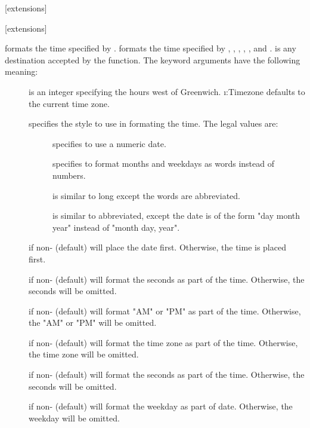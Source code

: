 [extensions]{
       }

[extensions]{
              }

 formats the time specified by .
 formats the time specified by ,
, , , , and .
 is any destination accepted by the  function.
The keyword arguments have the following meaning:
\begin{description}

\item[]
is an integer specifying the hours west of Greenwich.
\i{:Timezone} defaults to the current time zone.

\item[]
specifies the style to use in formating the time.  The legal
values are:
\begin{description}

\item[]
specifies to use a numeric date.

\item[]
specifies to format months and weekdays as words instead of
numbers.

\item[]
is similar to long except the words are abbreviated.

\item[]
is similar to abbreviated, except the date is of the form
"day month year" instead of "month day, year".
\end{description}

\item[]
if non-\false{} (default) will place the date first.
Otherwise, the time is placed first.

\item[]
if non-\false{} (default) will format the seconds as part of
the time.  Otherwise, the seconds will be omitted.

\item[]
if non-\false{} (default) will format "AM" or "PM" as part of
the time.  Otherwise, the "AM" or "PM" will be omitted.

\item[]
if non-\false{} (default) will format the time zone as part of
the time.  Otherwise, the time zone will be omitted.

\item[]
if non-\false{} (default) will format the seconds as part of
the time.  Otherwise, the seconds will be omitted.

\item[]
if non-\false{} (default) will format the weekday as part of
date.  Otherwise, the weekday will be omitted.
\end{description}
\enddefun


